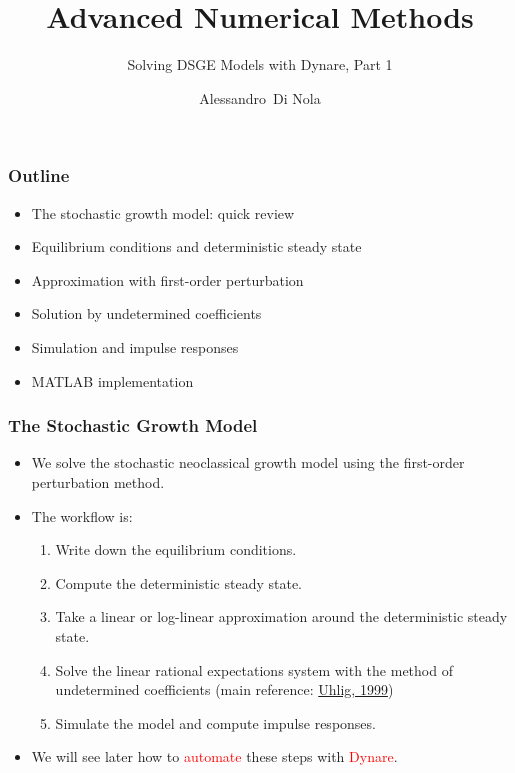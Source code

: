 \documentclass{beamer}
\institute[University of Birmingham]{University of Birmingham}
\begin{document}
\title{Advanced Numerical Methods}
\subtitle{Solving DSGE Models with Dynare, Part 1}
\author{Alessandro~Di Nola}
\date{}

\begin{frame}
\titlepage
\end{frame}

\begin{frame}
\frametitle{Outline}

\begin{itemize}
\item The stochastic growth model: quick review
\item Equilibrium conditions and deterministic steady state
\item Approximation with first-order perturbation
\item Solution by undetermined coefficients
\item Simulation and impulse responses
\item MATLAB implementation
\end{itemize}

\end{frame}

\begin{frame}
\frametitle{The Stochastic Growth Model}

\begin{itemize}
\item We solve the stochastic neoclassical growth model using the first-order perturbation method.
\item The workflow is:
\begin{enumerate}
\item Write down the equilibrium conditions.
\item Compute the deterministic steady state.
\item Take a linear or log-linear approximation around the deterministic steady state.
\item Solve the linear rational expectations system with the method of undetermined coefficients (main reference: \hyperlink{ref:uhlig}{Uhlig, 1999})
\item Simulate the model and compute impulse responses.
\end{enumerate}
\item We will see later how to \textcolor{red}{automate} these steps with \textcolor{red}{Dynare}.
\end{itemize}

\end{frame}
\end{document}
